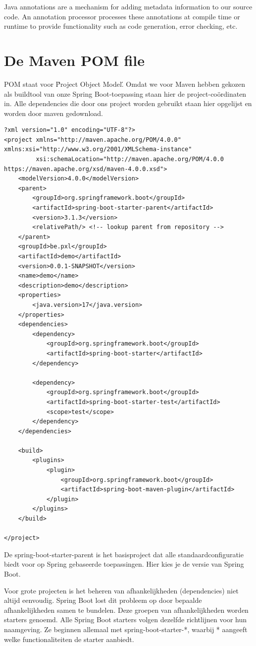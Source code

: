 Java annotations are a mechanism for adding metadata information to our source code. An annotation processor processes these annotations at compile time or runtime to provide functionality such as code generation, error checking, etc.

\section{De Maven POM file}

POM staat voor \'Project Object Model\'. Omdat we voor Maven hebben gekozen als buildtool van onze Spring Boot-toepassing staan hier de project-co\"ordinaten in. Alle dependencies die door ons project worden gebruikt staan hier opgelijst en worden door maven gedownload.

\begin{lstlisting}[frame=single]
?xml version="1.0" encoding="UTF-8"?>
<project xmlns="http://maven.apache.org/POM/4.0.0" xmlns:xsi="http://www.w3.org/2001/XMLSchema-instance"
         xsi:schemaLocation="http://maven.apache.org/POM/4.0.0 https://maven.apache.org/xsd/maven-4.0.0.xsd">
	<modelVersion>4.0.0</modelVersion>
	<parent>
		<groupId>org.springframework.boot</groupId>
		<artifactId>spring-boot-starter-parent</artifactId>
		<version>3.1.3</version>
		<relativePath/> <!-- lookup parent from repository -->
	</parent>
	<groupId>be.pxl</groupId>
	<artifactId>demo</artifactId>
	<version>0.0.1-SNAPSHOT</version>
	<name>demo</name>
	<description>demo</description>
	<properties>
		<java.version>17</java.version>
	</properties>
	<dependencies>
		<dependency>
			<groupId>org.springframework.boot</groupId>
			<artifactId>spring-boot-starter</artifactId>
		</dependency>

		<dependency>
			<groupId>org.springframework.boot</groupId>
			<artifactId>spring-boot-starter-test</artifactId>
			<scope>test</scope>
		</dependency>
	</dependencies>

	<build>
		<plugins>
			<plugin>
				<groupId>org.springframework.boot</groupId>
				<artifactId>spring-boot-maven-plugin</artifactId>
			</plugin>
		</plugins>
	</build>

</project>

\end{lstlisting}
De spring-boot-starter-parent is het basisproject dat alle standaardconfiguratie biedt voor op Spring gebaseerde toepassingen. Hier kies je de versie van Spring Boot.

Voor grote projecten is het beheren van afhankelijkheden (dependencies) niet altijd eenvoudig. Spring Boot lost dit probleem op door bepaalde afhankelijkheden samen te bundelen. Deze groepen van afhankelijkheden worden starters genoemd. Alle Spring Boot starters volgen dezelfde richtlijnen voor hun naamgeving.  Ze beginnen allemaal met spring-boot-starter-*, waarbij * aangeeft welke functionaliteiten de starter aanbiedt.

